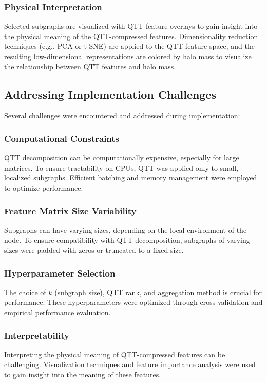 \documentclass[twocolumn]{aastex631}
\begin{document}
\subsubsection{Physical Interpretation}
Selected subgraphs are visualized with QTT feature overlays to gain insight into the physical meaning of the QTT-compressed features. Dimensionality reduction techniques (e.g., PCA or t-SNE) are applied to the QTT feature space, and the resulting low-dimensional representations are colored by halo mass to visualize the relationship between QTT features and halo mass.

\subsection{Addressing Implementation Challenges}

Several challenges were encountered and addressed during implementation:

\subsubsection{Computational Constraints}
QTT decomposition can be computationally expensive, especially for large matrices. To ensure tractability on CPUs, QTT was applied only to small, localized subgraphs. Efficient batching and memory management were employed to optimize performance.

\subsubsection{Feature Matrix Size Variability}
Subgraphs can have varying sizes, depending on the local environment of the node. To ensure compatibility with QTT decomposition, subgraphs of varying sizes were padded with zeros or truncated to a fixed size.

\subsubsection{Hyperparameter Selection}
The choice of \(k\) (subgraph size), QTT rank, and aggregation method is crucial for performance. These hyperparameters were optimized through cross-validation and empirical performance evaluation.

\subsubsection{Interpretability}
Interpreting the physical meaning of QTT-compressed features can be challenging. Visualization techniques and feature importance analysis were used to gain insight into the meaning of these features.
\end{document}
